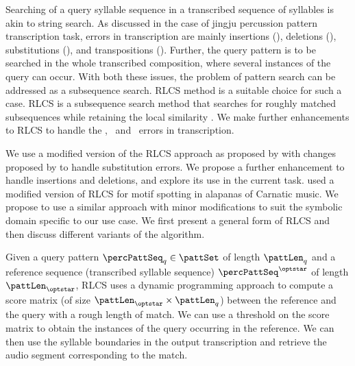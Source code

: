 Searching of a query syllable sequence in a transcribed sequence of syllables is akin to string search. As discussed in the case of \gls{jingju} percussion pattern transcription task, errors in transcription are mainly insertions (\strInsErr), deletions (\strDelErr), substitutions (\strSubErr), and transpositions (\strTrnErr). Further, the query pattern is to be searched in the whole transcribed composition, where several instances of the query can occur. With both these issues, the problem of pattern search can be addressed as a subsequence search. \acrfull{RLCS} method is a suitable choice for such a case. \gls{RLCS} is a subsequence search method that searches for roughly matched subsequences while retaining the local similarity \cite{lin:11:rlcs}. We make further enhancements to \gls{RLCS} to handle the \strInsErr, \strDelErr\ and \strSubErr\ errors in transcription. 

We use a modified version of the \gls{RLCS} approach as proposed by  with changes proposed by  to handle substitution errors. We propose a further enhancement to handle insertions and deletions, and explore its use in the current task.  used a modified version of \gls{RLCS} for motif spotting in \glspl{alapana} of Carnatic music. We propose to use a similar approach with minor modifications to suit the symbolic domain specific to our use case. We first present a general form of \gls{RLCS} and then discuss different variants of the algorithm.

Given a query pattern $\percPattSeq_q \in \pattSet$ of length $\pattLen_q$ and a reference sequence (transcribed syllable sequence) $\percPattSeq^{\optstar}$ of length $\pattLen_{\optstar}$, \gls{RLCS} uses a dynamic programming approach to compute a score matrix (of size $\pattLen_{\optstar} \times \pattLen_{q}$) between the reference and the query with a rough length of match. We can use a threshold on the score matrix to obtain the instances of the query occurring in the reference. We can then use the syllable boundaries in the output transcription and retrieve the audio segment corresponding to the match.

